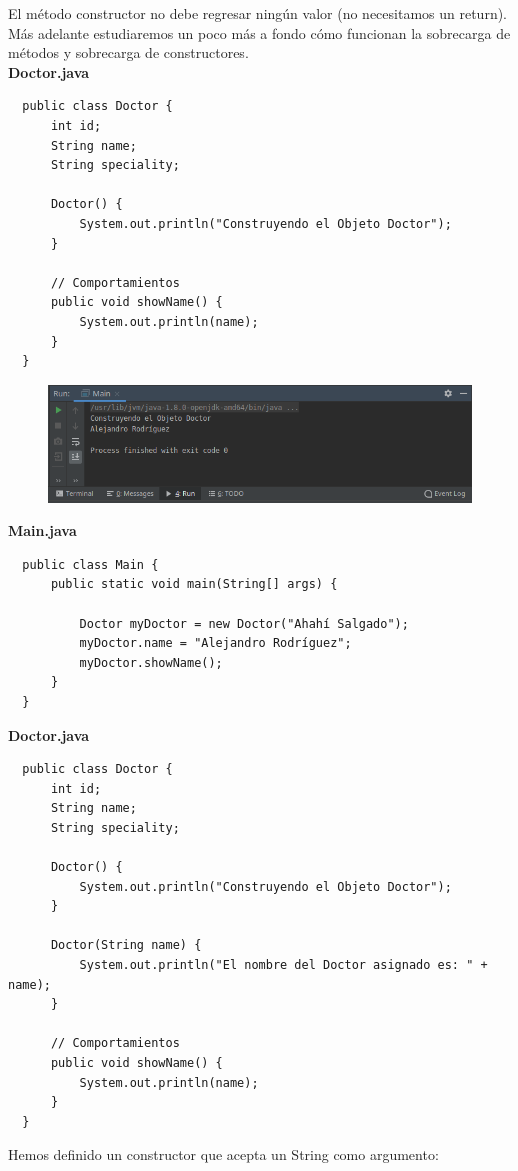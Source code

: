\documentclass{article}
\begin{document}
El método constructor no debe regresar ningún valor (no necesitamos un return).
Más adelante estudiaremos un poco más a fondo cómo funcionan la sobrecarga de
métodos y sobrecarga de constructores.\\

\textbf{Doctor.java}
\begin{verbatim}
  public class Doctor {
      int id;
      String name;
      String speciality;

      Doctor() {
          System.out.println("Construyendo el Objeto Doctor");
      }

      // Comportamientos
      public void showName() {
          System.out.println(name);
      }
  }
\end{verbatim}

\begin{figure}[h!]
  \centering
  \includegraphics[scale=0.75]{./Pictures/014_constructor.png}
\end{figure}

\textbf{Main.java}
\begin{verbatim}
  public class Main {
      public static void main(String[] args) {

          Doctor myDoctor = new Doctor("Ahahí Salgado");
          myDoctor.name = "Alejandro Rodríguez";
          myDoctor.showName();
      }
  }
\end{verbatim}

\textbf{Doctor.java}
\begin{verbatim}
  public class Doctor {
      int id;
      String name;
      String speciality;

      Doctor() {
          System.out.println("Construyendo el Objeto Doctor");
      }

      Doctor(String name) {
          System.out.println("El nombre del Doctor asignado es: " + name);
      }

      // Comportamientos
      public void showName() {
          System.out.println(name);
      }
  }
\end{verbatim}

Hemos definido un constructor que acepta un String como argumento:\\
\end{document}
